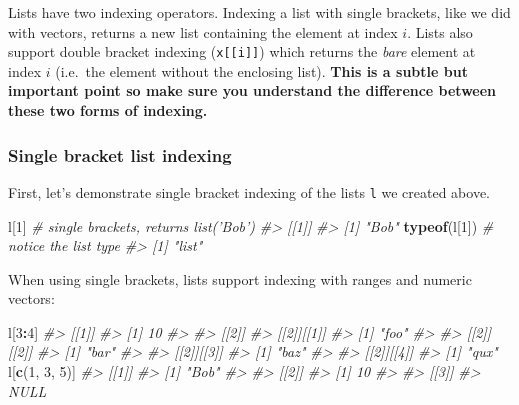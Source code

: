 \documentclass[]{book}
\newenvironment{Shaded}{\begin{snugshade}}{\end{snugshade}}
\newcommand{\CommentTok}[1]{\textcolor[rgb]{0.56,0.35,0.01}{\textit{#1}}}
\newcommand{\DecValTok}[1]{\textcolor[rgb]{0.00,0.00,0.81}{#1}}
\newcommand{\KeywordTok}[1]{\textcolor[rgb]{0.13,0.29,0.53}{\textbf{#1}}}
\newcommand{\NormalTok}[1]{#1}
\newcommand{\OperatorTok}[1]{\textcolor[rgb]{0.81,0.36,0.00}{\textbf{#1}}}
\theoremstyle{definition}
\theoremstyle{definition}
\theoremstyle{definition}
\theoremstyle{remark}
\begin{document}
Lists have two indexing operators. Indexing a list with single brackets,
like we did with vectors, returns a new list containing the element at
index \(i\). Lists also support double bracket indexing
(\texttt{x{[}{[}i{]}{]}}) which returns the \emph{bare} element at index
\(i\) (i.e.~the element without the enclosing list). \textbf{This is a
subtle but important point so make sure you understand the difference
between these two forms of indexing.}

\hypertarget{single-bracket-list-indexing}{%
\subsubsection{Single bracket list
indexing}\label{single-bracket-list-indexing}}

First, let's demonstrate single bracket indexing of the lists \texttt{l}
we created above.

\begin{Shaded}
\begin{Highlighting}[]
\NormalTok{l[}\DecValTok{1}\NormalTok{]           }\CommentTok{# single brackets, returns list('Bob') }
\CommentTok{#> [[1]]}
\CommentTok{#> [1] "Bob"}
\KeywordTok{typeof}\NormalTok{(l[}\DecValTok{1}\NormalTok{])   }\CommentTok{# notice the list type}
\CommentTok{#> [1] "list"}
\end{Highlighting}
\end{Shaded}

When using single brackets, lists support indexing with ranges and
numeric vectors:

\begin{Shaded}
\begin{Highlighting}[]
\NormalTok{l[}\DecValTok{3}\OperatorTok{:}\DecValTok{4}\NormalTok{]}
\CommentTok{#> [[1]]}
\CommentTok{#> [1] 10}
\CommentTok{#> }
\CommentTok{#> [[2]]}
\CommentTok{#> [[2]][[1]]}
\CommentTok{#> [1] "foo"}
\CommentTok{#> }
\CommentTok{#> [[2]][[2]]}
\CommentTok{#> [1] "bar"}
\CommentTok{#> }
\CommentTok{#> [[2]][[3]]}
\CommentTok{#> [1] "baz"}
\CommentTok{#> }
\CommentTok{#> [[2]][[4]]}
\CommentTok{#> [1] "qux"}
\NormalTok{l[}\KeywordTok{c}\NormalTok{(}\DecValTok{1}\NormalTok{, }\DecValTok{3}\NormalTok{, }\DecValTok{5}\NormalTok{)]}
\CommentTok{#> [[1]]}
\CommentTok{#> [1] "Bob"}
\CommentTok{#> }
\CommentTok{#> [[2]]}
\CommentTok{#> [1] 10}
\CommentTok{#> }
\CommentTok{#> [[3]]}
\CommentTok{#> NULL}
\end{Highlighting}
\end{Shaded}
\end{document}
